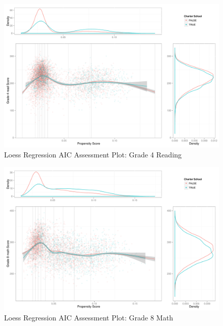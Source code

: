 \documentclass[letterpaper,12p,twoside]{article} %
\begin{document}
\begin{figure}[h!]
\begin{center}
\includegraphics[height=.4\textheight]{../Figures2009/g4read-loessAIC.pdf}
\caption{Loess Regression AIC Assessment Plot: Grade 4 Reading}
\label{fig:g4read:loess}
\end{center}
\end{figure}

\begin{figure}[h!]
\begin{center}
\includegraphics[height=.4\textheight]{../Figures2009/g8math-loessAIC.pdf}
\caption{Loess Regression AIC Assessment Plot: Grade 8 Math}
\label{fig:g8math:loess}
\end{center}
\end{figure}
\end{document}
